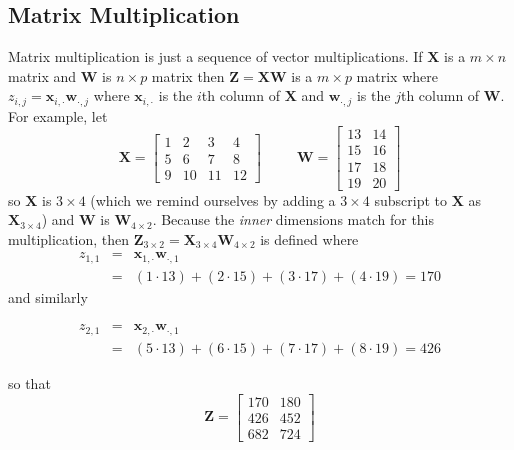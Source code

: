 \documentclass[]{book}
\theoremstyle{definition}
\theoremstyle{definition}
\theoremstyle{remark}
\begin{document}
\subsection{Matrix Multiplication}\label{matrix-multiplication}

Matrix multiplication is just a sequence of vector multiplications. If
\(\boldsymbol{X}\) is a \(m\times n\) matrix and \(\boldsymbol{W}\) is
\(n\times p\) matrix then \(\boldsymbol{Z}=\boldsymbol{XW}\) is a
\(m\times p\) matrix where
\(z_{i,j}=\boldsymbol{x}_{i,\cdot}\boldsymbol{w}_{\cdot, j}\) where
\(\boldsymbol{x}_{i,\cdot}\) is the \(i\)th column of \(\boldsymbol{X}\)
and \(\boldsymbol{w}_{\cdot, j}\) is the \(j\)th column of
\(\boldsymbol{W}\). For example, let \[
\boldsymbol{X}=\left[\begin{array}{cccc}
1 & 2 & 3 & 4\\
5 & 6 & 7 & 8\\
9 & 10 & 11 & 12
\end{array}\right]\;\;\;\;\;\;\;\;\;\boldsymbol{W}=\left[\begin{array}{cc}
13 & 14\\
15 & 16\\
17 & 18\\
19 & 20
\end{array}\right]
\] so \(\boldsymbol{X}\) is \(3\times4\) (which we remind ourselves by
adding a \(3\times4\) subscript to \(\boldsymbol{X}\) as
\(\boldsymbol{X}_{3\times4}\)) and \(\boldsymbol{W}\) is
\(\boldsymbol{W}{}_{4\times2}\). Because the \emph{inner} dimensions
match for this multiplication, then
\(\boldsymbol{Z}_{3\times2}=\boldsymbol{X}_{3\times4}\boldsymbol{W}_{4\times2}\)
is defined where\textbf{ 
\begin{eqnarray*}
z_{1,1} & = & \boldsymbol{x}_{1,\cdot}\boldsymbol{w}_{\cdot,1}\\
 & = & \left(1\cdot13\right)+\left(2\cdot15\right)+\left(3\cdot17\right)+\left(4\cdot19\right)=170
\end{eqnarray*}
}and similarly

\begin{eqnarray*}
z_{2,1} & = & \boldsymbol{x}_{2,\cdot}\boldsymbol{w}_{\cdot,1}\\
 & = & \left(5\cdot13\right)+\left(6\cdot15\right)+\left(7\cdot17\right)+\left(8\cdot19\right)=426
\end{eqnarray*}

so that \[
\boldsymbol{Z}=\left[\begin{array}{cc}
170 & 180\\
426 & 452\\
682 & 724
\end{array}\right]
\]
\end{document}
